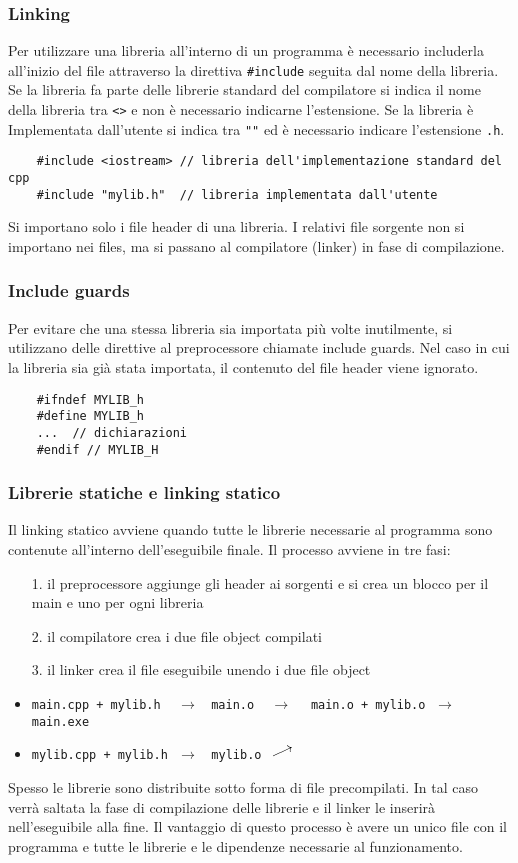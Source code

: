 \documentclass[a4paper]{article}
\newcommand{\toprightarrow}{\mathrel{\raisebox{0.25 em}{\rotatebox[origin=c]{25}{$\longrightarrow$}}}} %
\begin{document}
\subsubsection*{Linking}
Per utilizzare una libreria all'interno di un programma è necessario includerla all'inizio del file attraverso la direttiva
\verb|#include| seguita dal nome della libreria. Se la libreria fa parte delle librerie standard del compilatore si indica il nome
della libreria tra \verb|<>| e non è necessario indicarne l'estensione. Se la libreria è Implementata dall'utente si indica tra
\verb|""| ed è necessario indicare l'estensione \verb|.h|.
\begin{lstlisting}
	#include <iostream> // libreria dell'implementazione standard del cpp
	#include "mylib.h"  // libreria implementata dall'utente
\end{lstlisting}
Si importano solo i file header di una libreria. I relativi file sorgente non si importano nei files, ma si passano al compilatore
(linker) in fase di compilazione.

\subsubsection*{Include guards}
Per evitare che una stessa libreria sia importata più volte inutilmente, si utilizzano delle direttive al preprocessore chiamate
include guards. Nel caso in cui la libreria sia già stata importata, il contenuto del file header viene ignorato.
\begin{lstlisting}
	#ifndef MYLIB_h
	#define MYLIB_h
	...  // dichiarazioni
	#endif // MYLIB_H
\end{lstlisting}

\subsubsection*{Librerie statiche e linking statico}
Il linking statico avviene quando tutte le librerie necessarie al programma sono contenute all'interno dell'eseguibile finale. Il
processo avviene in tre fasi:
\begin{itemize}[topsep=0pt]
	\item[1.] il preprocessore aggiunge gli header ai sorgenti e si crea un blocco per il main e uno per ogni libreria
	\item[2.] il compilatore crea i due file object compilati
	\item[3.] il linker crea il file eseguibile unendo i due file object
	\item \verb|main.cpp + mylib.h| \(\;\;\;\rightarrow\;\;\) \verb|main.o| \(\;\;\;\longrightarrow\quad\) \verb|main.o + mylib.o| \(\;\rightarrow\;\) \verb|main.exe|
	\item \verb|mylib.cpp + mylib.h| \(\,\,\rightarrow\;\;\) \verb|mylib.o| \(\,\,\toprightarrow\)
\end{itemize}
Spesso le librerie sono distribuite sotto forma di file precompilati. In tal caso verrà saltata la fase di compilazione delle
librerie e il linker le inserirà nell'eseguibile alla fine. Il vantaggio di questo processo è avere un unico file con il programma
e tutte le librerie e le dipendenze necessarie al funzionamento.
\end{document}
